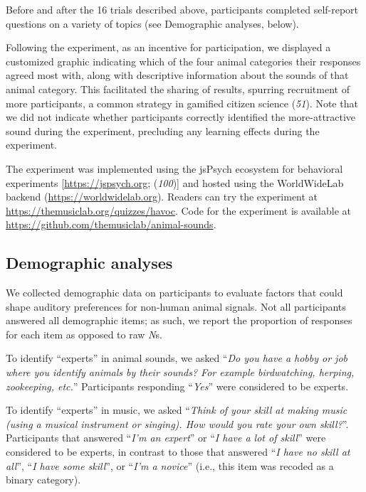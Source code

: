 \documentclass[
]{article}
\begin{document}
Before and after the 16 trials described above, participants completed
self-report questions on a variety of topics (see Demographic analyses,
below).

Following the experiment, as an incentive for participation, we
displayed a customized graphic indicating which of the four animal
categories their responses agreed most with, along with descriptive
information about the sounds of that animal category. This facilitated
the sharing of results, spurring recruitment of more participants, a
common strategy in gamified citizen science (\emph{51}). Note that we
did not indicate whether participants correctly identified the
more-attractive sound during the experiment, precluding any learning
effects during the experiment.

The experiment was implemented using the jsPsych ecosystem for
behavioral experiments {[}\url{https://jspsych.org}; (\emph{100}){]} and
hosted using the WorldWideLab backend (\url{https://worldwidelab.org}).
Readers can try the experiment at
\url{https://themusiclab.org/quizzes/havoc}. Code for the experiment is
available at \url{https://github.com/themusiclab/animal-sounds}.

\subsection{Demographic analyses}\label{demographic-analyses}

We collected demographic data on participants to evaluate factors that
could shape auditory preferences for non-human animal signals. Not all
participants answered all demographic items; as such, we report the
proportion of responses for each item as opposed to raw \emph{N}s.

To identify ``experts'' in animal sounds, we asked ``\emph{Do you have a
hobby or job where you identify animals by their sounds? For example
birdwatching, herping, zookeeping, etc.}'' Participants responding
``\emph{Yes}'' were considered to be experts.

To identify ``experts'' in music, we asked ``\emph{Think of your skill
at making music (using a musical instrument or singing). How would you
rate your own skill?}''. Participants that answered ``\emph{I'm an
expert}'' or ``\emph{I have a lot of skill}'' were considered to be
experts, in contrast to those that answered ``\emph{I have no skill at
all}'', ``\emph{I have some skill}'', or ``\emph{I'm a novice}'' (i.e.,
this item was recoded as a binary category).
\end{document}
